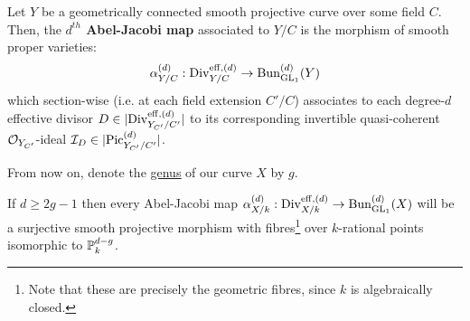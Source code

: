         \begin{definition} \label{def: the_abel_jacobi_map}
            Let $Y$ be a geometrically connected smooth projective curve over some field $C$. Then, the \textbf{$d^{th}$ Abel-Jacobi map} associated to $Y/C$ is the morphism of smooth proper varieties:
                $$\alpha_{Y/C}^{(d)}: \Div_{Y/C}^{\eff, (d)} \to \Bun_{\GL_1}^{(d)}(Y)$$
            which section-wise (i.e. at each field extension $C'/C$) associates to each degree-$d$ effective divisor $D \in |\Div_{Y_{C'}/C'}^{\eff, (d)}|$ to its corresponding invertible quasi-coherent $\calO_{Y_{C'}}$-ideal $\calI_D \in |\Pic_{Y_{C'}/C'}^{(d)}|$.
        \end{definition}
        \begin{remark} \label{remark: abel_jacobi_map}
            
        \end{remark}
        \begin{convention} \label{conv: genus_of_the_curve}
            From now on, denote the \href{https://stacks.math.columbia.edu/tag/0BY6}{\underline{genus}} of our curve $X$ by $g$.
        \end{convention}
        \begin{proposition} \label{prop: the_unramified_abel_jacobi_map_is_a_projective_bundle}
            If $d \geq 2g - 1$ then every Abel-Jacobi map $\alpha_{X/k}^{(d)}: \Div_{X/k}^{\eff, (d)} \to \Bun_{\GL_1}^{(d)}(X)$ will be a surjective smooth projective morphism with fibres\footnote{Note that these are precisely the geometric fibres, since $k$ is algebraically closed.} over $k$-rational points isomorphic to $\P^{d - g}_k$.
        \end{proposition}
